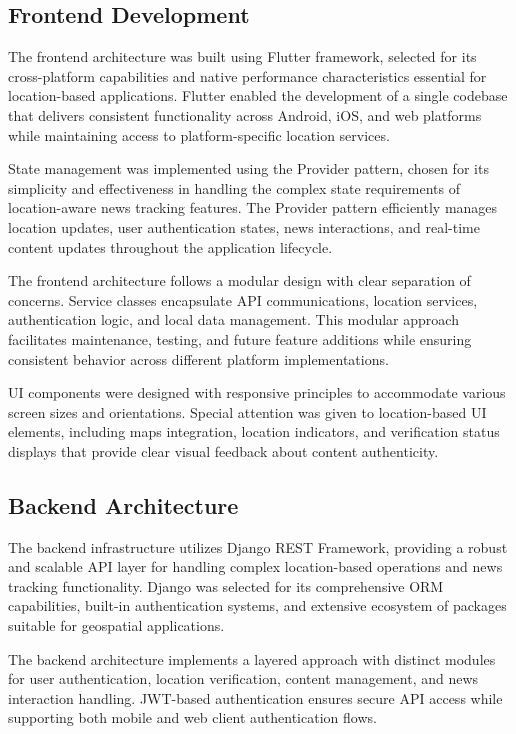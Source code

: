 \subsection{Frontend Development}
\label{subsec:frontend-development}

The frontend architecture was built using Flutter framework, selected for its cross-platform capabilities and native performance characteristics essential for location-based applications. Flutter enabled the development of a single codebase that delivers consistent functionality across Android, iOS, and web platforms while maintaining access to platform-specific location services.

State management was implemented using the Provider pattern, chosen for its simplicity and effectiveness in handling the complex state requirements of location-aware news tracking features. The Provider pattern efficiently manages location updates, user authentication states, news interactions, and real-time content updates throughout the application lifecycle.

The frontend architecture follows a modular design with clear separation of concerns. Service classes encapsulate API communications, location services, authentication logic, and local data management. This modular approach facilitates maintenance, testing, and future feature additions while ensuring consistent behavior across different platform implementations.

UI components were designed with responsive principles to accommodate various screen sizes and orientations. Special attention was given to location-based UI elements, including maps integration, location indicators, and verification status displays that provide clear visual feedback about content authenticity.

\subsection{Backend Architecture}
\label{subsec:backend-architecture}

The backend infrastructure utilizes Django REST Framework, providing a robust and scalable API layer for handling complex location-based operations and news tracking functionality. Django was selected for its comprehensive ORM capabilities, built-in authentication systems, and extensive ecosystem of packages suitable for geospatial applications.

The backend architecture implements a layered approach with distinct modules for user authentication, location verification, content management, and news interaction handling. JWT-based authentication ensures secure API access while supporting both mobile and web client authentication flows.

